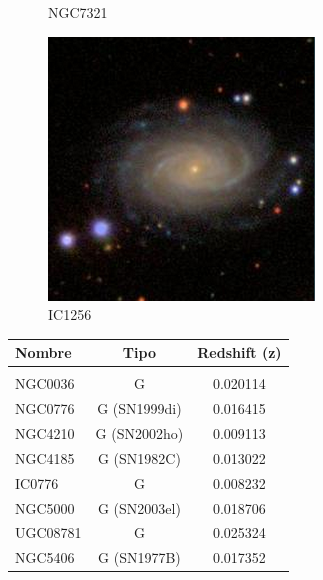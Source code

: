 \documentclass[9pt]{revtex4-1}
\begin{document}
\begin{figure}[h]
\caption{NGC7321}
\includegraphics[scale=0.3]{IC1256.png}
\caption{IC1256}
\end{figure}


\begin{center}
\begin{tabular}{ l c c }
Nombre & Tipo & Redshift (z) \\
\hline
\hline \\
NGC0036 & G & 0.020114 \\
NGC0776 & G (SN1999di) & 0.016415 \\
NGC4210 & G (SN2002ho) & 0.009113 \\
NGC4185 & G (SN1982C)  & 0.013022 \\
IC0776  & G & 0.008232 \\
NGC5000 & G (SN2003el) & 0.018706 \\
UGC08781 & G & 0.025324 \\
NGC5406 & G (SN1977B) & 0.017352

\end{tabular}
\end{center}
\end{document}
